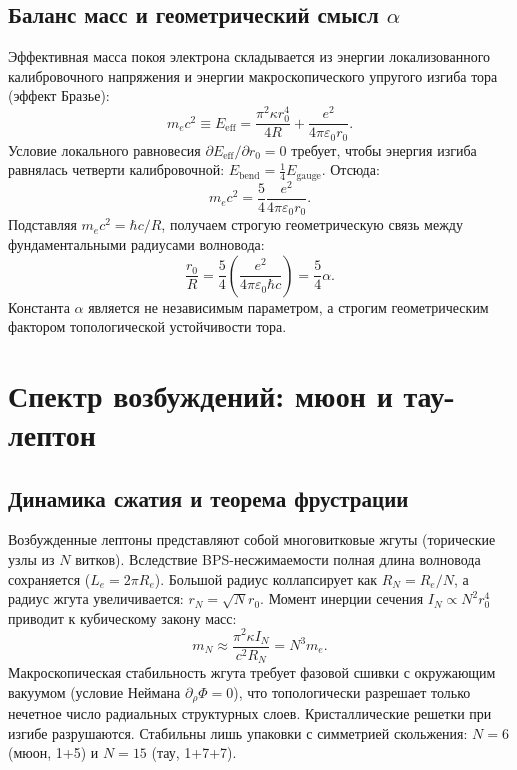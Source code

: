 \documentclass[12pt,a4paper]{article}
\begin{document}
	\subsection{Баланс масс и геометрический смысл $\alpha$}
	Эффективная масса покоя электрона складывается из энергии локализованного калибровочного напряжения и энергии макроскопического упругого изгиба тора (эффект Бразье):
	\begin{equation}
		m_e c^2 \equiv E_{\text{eff}} = \frac{\pi^2 \kappa r_0^4}{4R} + \frac{e^2}{4\pi\varepsilon_0 r_0}.
		\label{eq:effective_mass_functional}
	\end{equation}
	Условие локального равновесия $\partial E_{\text{eff}} / \partial r_0 = 0$ требует, чтобы энергия изгиба равнялась четверти калибровочной: $E_{\text{bend}} = \frac{1}{4} E_{\text{gauge}}$. Отсюда:
	\begin{equation}
		m_e c^2 = \frac{5}{4} \frac{e^2}{4\pi\varepsilon_0 r_0}.
		\label{eq:virial_local}
	\end{equation}
	Подставляя $m_e c^2 = \hbar c / R$, получаем строгую геометрическую связь между фундаментальными радиусами волновода:
	\begin{equation}
		\frac{r_0}{R} = \frac{5}{4} \left( \frac{e^2}{4\pi\varepsilon_0 \hbar c} \right) = \frac{5}{4} \alpha.
		\label{eq:alpha_exact}
	\end{equation}
	Константа $\alpha$ является не независимым параметром, а строгим геометрическим фактором топологической устойчивости тора.
	
	\section{Спектр возбуждений: мюон и тау-лептон}
	
	\subsection{Динамика сжатия и теорема фрустрации}
	Возбужденные лептоны представляют собой многовитковые жгуты (торические узлы из $N$ витков). Вследствие BPS-несжимаемости полная длина волновода сохраняется ($L_e = 2\pi R_e$). Большой радиус коллапсирует как $R_N = R_e / N$, а радиус жгута увеличивается: $r_N = \sqrt{N} r_0$. Момент инерции сечения $I_N \propto N^2 r_0^4$ приводит к кубическому закону масс:
	\begin{equation}
		m_N \approx \frac{\pi^2 \kappa I_N}{c^2 R_N} = N^3 m_e.
	\end{equation}
	Макроскопическая стабильность жгута требует фазовой сшивки с окружающим вакуумом (условие Неймана $\partial_\rho \Phi = 0$), что топологически разрешает только нечетное число радиальных структурных слоев. Кристаллические решетки при изгибе разрушаются. Стабильны лишь упаковки с симметрией скольжения: $N=6$ (мюон, 1+5) и $N=15$ (тау, 1+7+7).
	
\end{document}
